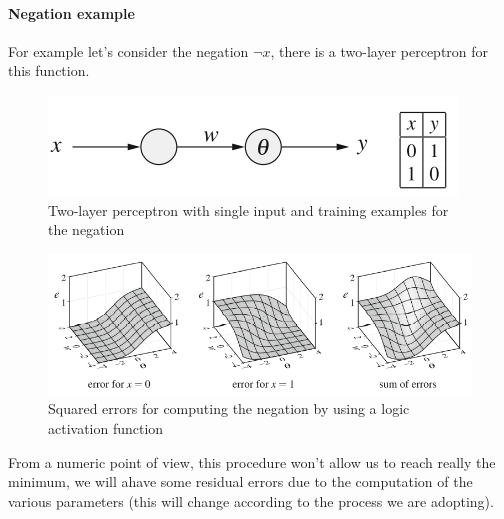 \documentclass{article}
\begin{document}
\paragraph{Negation example}
For example let's consider the negation $\lnot x$, there is a two-layer perceptron for this function.
\begin{figure}[H]
    \centering
    \includegraphics[scale=0.5]{images/2_per_neg.png}
    \caption{Two-layer perceptron with single input and training examples for the negation}
\end{figure}
\begin{figure}[H]
    \centering
    \includegraphics[scale=0.55]{images/squared_errors.png}
    \caption{Squared errors for computing the negation by using a logic activation function}
\end{figure}
From a numeric point of view, this procedure won't allow us to reach really the minimum, we will ahave some
residual errors due to the computation of the various parameters (this will change according to the
process we are adopting).
\end{document}
